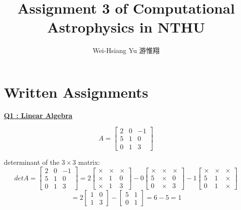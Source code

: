 \documentclass{article}
\title{Assignment 3 of Computational Astrophysics in NTHU}
\author{Wei-Hsiang Yu 游惟翔}
\begin{document}
\begin{CJK}{UTF8}{bsmi}
\maketitle
\end{CJK}


\section{Written Assignments}
\underline{\textbf{Q1 : Linear Algebra\\}}

\[
A=
\begin{bmatrix}
2& 0& -1 \\
5& 1& 0\\
0& 1& 3
\end{bmatrix}
\]

determinant of the $3\times3$ matrix:\\
\[
det A=
\begin{bmatrix}
2& 0& -1 \\
5& 1& 0\\
0& 1& 3
\end{bmatrix}
=2
\begin{bmatrix}\times& \times& \times \\\times& 1& 0\\\times& 1& 3\end{bmatrix}
-0
\begin{bmatrix}\times& \times& \times \\5& \times& 0\\0& \times& 3\end{bmatrix}
-1
\begin{bmatrix}\times& \times& \times \\5& 1& \times\\0& 1& \times\end{bmatrix}
\]
\[
=
2
\begin{bmatrix}1& 0\\1& 3\end{bmatrix}
-
\begin{bmatrix}5& 1\\0& 1\end{bmatrix}
=6-5=1
\]
\end{document}
